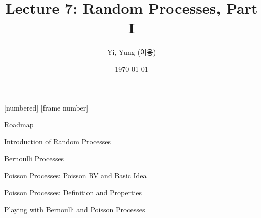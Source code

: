 

\csname\pdfmode\endcsname

{
  [numbered]
  [frame number]  %
}







\title[]{Lecture 7: Random Processes, Part I}
\author{Yi, Yung (이융)}
\date{\today}








\begin{frame}
  \titlepage
\end{frame}




\begin{frame}{Roadmap}

\plitemsep 0.2in

\bce[(1)]



\item Introduction of Random Processes
\item Bernoulli Processes
\item Poisson Processes: Poisson RV and Basic Idea

\item Poisson Processes: Definition and Properties

\item Playing with Bernoulli and Poisson Processes

\ece

\end{frame}

